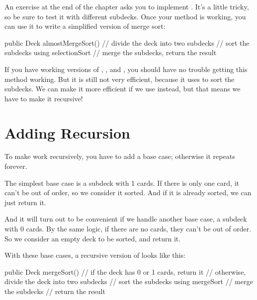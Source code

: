 An exercise at the end of the chapter asks you to implement .
It's a little tricky, so be sure to test it with different subdecks.
Once your  method is working, you can use it to write a simplified version of merge sort:

\begin{code}
public Deck almostMergeSort() {
    // divide the deck into two subdecks
    // sort the subdecks using selectionSort
    // merge the subdecks, return the result
}
\end{code}

If you have working versions of , , and , you should have no trouble getting this method working.
But it is still not very efficient, because it uses  to sort the subdecks.
We can make it more efficient if we use  instead, but that means we have to make it recursive!

\section{Adding Recursion}

To make  work recursively, you have to add a base case; otherwise it repeats forever.

The simplest base case is a subdeck with 1 cards.
If there is only one card, it can't be out of order, so we consider it sorted.
And if it is already sorted, we can just return it.

And it will turn out to be convenient if we handle another base case, a subdeck with 0 cards.
By the same logic, if there are no cards, they can't be out of order.
So we consider an empty deck to be sorted, and return it.

With these base cases, a recursive version of  looks like this:

\begin{code}
public Deck mergeSort() {
    // if the deck has 0 or 1 cards, return it
    // otherwise, divide the deck into two subdecks
    // sort the subdecks using mergeSort
    // merge the subdecks
    // return the result
}
\end{code}



